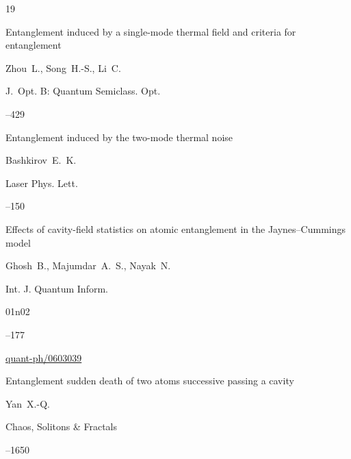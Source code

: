\begin{thebibliography}{19}

\paper Entanglement induced by a single-mode thermal field and criteria for entanglement

\by  Zhou~L.,  Song~H.-S., Li~C.

\jour J.~Opt. B: Quantum Semiclass. Opt.




--429





\paper Entanglement induced by the two-mode thermal noise

\by   Bashkirov~E.~K.

\jour Laser Phys. Lett.




--150





\paper Effects of cavity-field statistics on atomic entanglement in the Jaynes–Cummings model

\by   Ghosh~B.,  Majumdar~A.~S., Nayak~N.

\jour  Int. J. Quantum Inform.



\issue  01n02 

--177


\arxiv \href{arxiv.org/abs/quant-ph/0603039}{quant-ph/0603039}




\paper Entanglement sudden death of two atoms successive passing a cavity

\by   Yan~X.-Q.

\jour Chaos, Solitons \& Fractals




--1650





\end{thebibliography}
